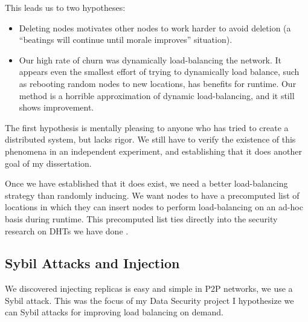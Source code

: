 This leads us to two hypotheses:
\begin{itemize}
	\item Deleting nodes motivates other nodes to work harder to avoid deletion (a ``beatings will continue until morale improves'' situation).
	\item Our high rate of churn was dynamically load-balancing the network.
	It appears even the smallest effort of trying to dynamically load balance, such as rebooting random nodes to new locations, has benefits for runtime.
	Our method is a horrible approximation of dynamic load-balancing, and it still shows improvement.
\end{itemize}

The first hypothesis is mentally pleasing to anyone who has tried to create a distributed system, but lacks rigor.
We still have to verify the existence of this phenomena in an independent experiment, and establishing that it does another goal of my dissertation.


Once we have established that it does exist, we need a better load-balancing strategy than randomly inducing.
We want nodes to have a precomputed list of locations in which they can insert nodes to perform load-balancing on an ad-hoc basis during runtime.
This precomputed list ties directly into the security research on DHTs we have done \cite{sybil-analysis}.









\subsection{Sybil Attacks and Injection}
We discovered injecting replicas is easy and simple in P2P networks, we use a Sybil attack.
This was the focus of my Data Security project
I hypothesize we can Sybil attacks for improving load balancing on demand.


